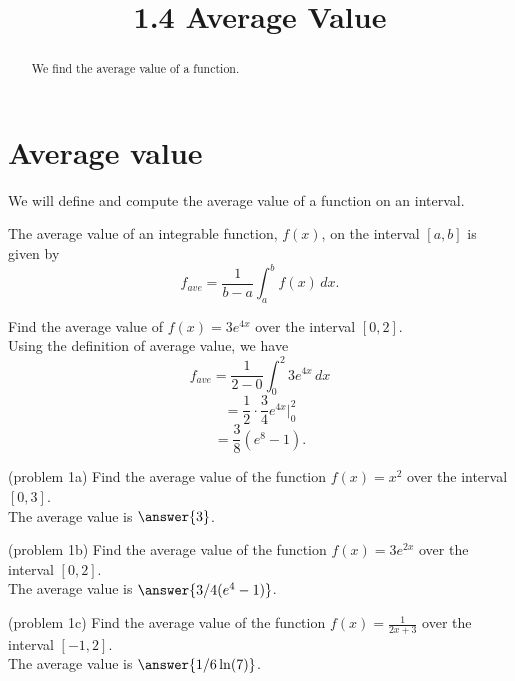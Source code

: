 \documentclass[handout]{ximera}
\title{1.4 Average Value}
\begin{document}
\begin{abstract}
We find the average value of a function.
\end{abstract}

\maketitle

\section{Average value}

We will define and compute the average value of a function on an interval. 

\begin{definition} The average value of an integrable function, $f(x)$, on the interval $[a,b]$ is given by
\[
f_{ave} = \frac{1}{b-a} \int_a^b f(x) \, dx.
\]
\end{definition}

\begin{example}[example 1]
Find the average value of $f(x) = 3e^{4x}$ over the interval $[0, 2]$.\\
Using the definition of average value, we have
\[
f_{ave} = \frac{1}{2-0} \int_0^2 3e^{4x} \, dx
\]
\[
= \frac12 \cdot \frac34e^{4x} \bigg|_0^2
\]
\[
= \frac38 \left(e^8 - 1\right).
\]
\end{example}




\begin{problem}(problem 1a)
Find the average value of the function $f(x) = x^2$ over the interval $[0, 3]$.\\
The average value is $\answer{3}$.
\end{problem}





\begin{problem}(problem 1b)
Find the average value of the function $f(x) = 3e^{2x}$ over the interval $[0, 2]$.\\
The average value is $\answer{3/4 (e^4 - 1)}$.
\end{problem}




\begin{problem}(problem 1c)
Find the average value of the function $f(x) = \displaystyle{\frac{1}{2x+3}}$ over the interval $[-1, 2]$.\\
The average value is $\answer{1/6 \ln(7)}$.
\end{problem}
\end{document}
